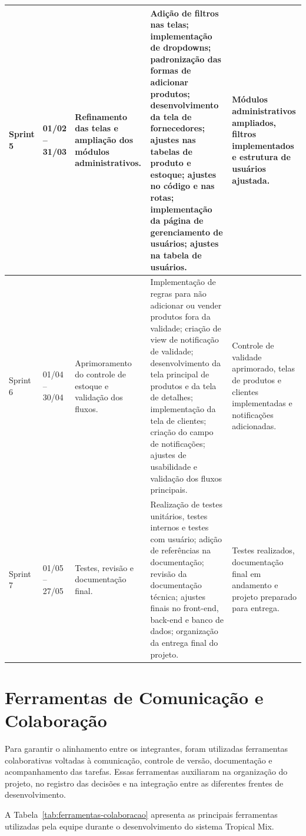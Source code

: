 \begin{table}[H]
{\begin{tabular}{|p{1.8cm}|p{2.4cm}|p{3.8cm}|p{6.3cm}|p{3.4cm}|}
Sprint 5 &
01/02 -- 31/03 &
Refinamento das telas e ampliação dos módulos administrativos. &
Adição de filtros nas telas; implementação de dropdowns; padronização das formas de adicionar produtos; desenvolvimento da tela de fornecedores; ajustes nas tabelas de produto e estoque; ajustes no código e nas rotas; implementação da página de gerenciamento de usuários; ajustes na tabela de usuários. &
Módulos administrativos ampliados, filtros implementados e estrutura de usuários ajustada. \\ \hline

Sprint 6 &
01/04 -- 30/04 &
Aprimoramento do controle de estoque e validação dos fluxos. &
Implementação de regras para não adicionar ou vender produtos fora da validade; criação de view de notificação de validade; desenvolvimento da tela principal de produtos e da tela de detalhes; implementação da tela de clientes; criação do campo de notificações; ajustes de usabilidade e validação dos fluxos principais. &
Controle de validade aprimorado, telas de produtos e clientes implementadas e notificações adicionadas. \\ \hline

Sprint 7 &
01/05 -- 27/05 &
Testes, revisão e documentação final. &
Realização de testes unitários, testes internos e testes com usuário; adição de referências na documentação; revisão da documentação técnica; ajustes finais no front-end, back-end e banco de dados; organização da entrega final do projeto. &
Testes realizados, documentação final em andamento e projeto preparado para entrega. \\ \hline

\end{tabular}%
}
\end{table}

\section{Ferramentas de Comunicação e Colaboração}

Para garantir o alinhamento entre os integrantes, foram utilizadas ferramentas colaborativas voltadas à comunicação, controle de versão, documentação e acompanhamento das tarefas. Essas ferramentas auxiliaram na organização do projeto, no registro das decisões e na integração entre as diferentes frentes de desenvolvimento.

A Tabela~\ref{tab:ferramentas-colaboracao} apresenta as principais ferramentas utilizadas pela equipe durante o desenvolvimento do sistema Tropical Mix.

